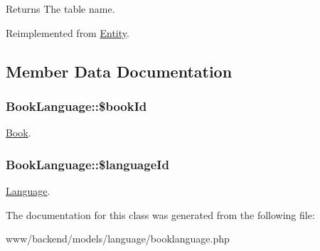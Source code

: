 \begin{DoxyReturn}{Returns}
The table name. 
\end{DoxyReturn}


Reimplemented from \hyperlink{classEntity_a8305fd94740ac62cbafb9de76567ce37}{Entity}.



\subsection{Member Data Documentation}
\hypertarget{classBookLanguage_a644c3c8cdc52b582ea932b3ca327840f}{
\subsubsection[{\$bookId}]{\setlength{\rightskip}{0pt plus 5cm}BookLanguage::\$bookId}}
\label{classBookLanguage_a644c3c8cdc52b582ea932b3ca327840f}
\hyperlink{classBook}{Book}. \hypertarget{classBookLanguage_a7cb17b4d967db7f5c09f3b9c31f8a8b5}{
\subsubsection[{\$languageId}]{\setlength{\rightskip}{0pt plus 5cm}BookLanguage::\$languageId}}
\label{classBookLanguage_a7cb17b4d967db7f5c09f3b9c31f8a8b5}
\hyperlink{classLanguage}{Language}. 

The documentation for this class was generated from the following file:\begin{DoxyCompactItemize}
\item 
www/backend/models/language/booklanguage.php\end{DoxyCompactItemize}
